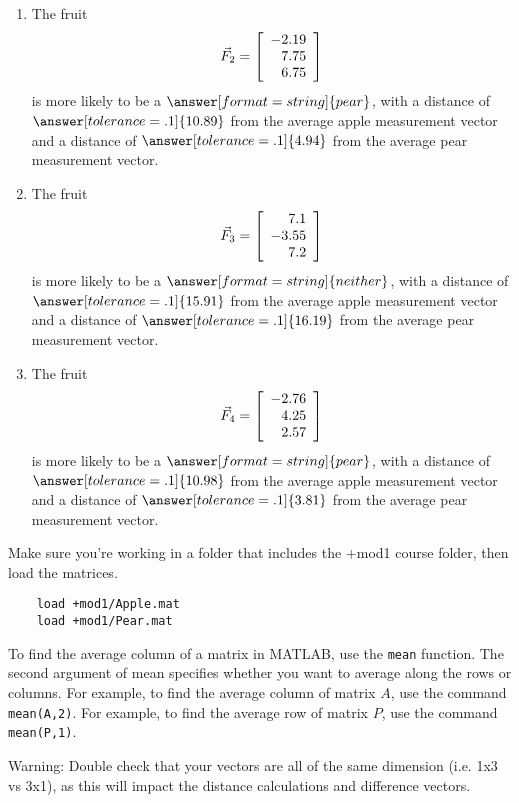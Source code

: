 \documentclass{ximera}
\begin{document}
\begin{exercise}
\begin{enumerate}
\item
The fruit
\begin{equation*}
  \vec{F}_2=\startmat{r}
    -2.19 \\
    7.75 \\
    6.75
  \stopmat
\end{equation*}
is more likely to be a $\answer[format=string]{pear}$, with a distance of $\answer[tolerance=.1]{10.89}$ from the average apple measurement vector and a distance of $\answer[tolerance=.1]{4.94}$ from the average pear measurement vector.

\item
The fruit
\begin{equation*}
  \vec{F}_3=\startmat{r}
    7.1 \\
    -3.55 \\
    7.2
  \stopmat
\end{equation*}
is more likely to be a $\answer[format=string]{neither}$, with a distance of $\answer[tolerance=.1]{15.91}$ from the average apple measurement vector and a distance of $\answer[tolerance=.1]{16.19}$ from the average pear measurement vector.

\item
The fruit
\begin{equation*}
  \vec{F}_4=\startmat{r}
    -2.76 \\
    4.25 \\
    2.57
  \stopmat
\end{equation*}
is more likely to be a $\answer[format=string]{pear}$, with a distance of $\answer[tolerance=.1]{10.98}$ from the average apple measurement vector and a distance of $\answer[tolerance=.1]{3.81}$ from the average pear measurement vector.

\end{enumerate}

\begin{hint}

  Make sure you're working in a folder that includes the +mod1 course folder, then load the matrices.
  \begin{verbatim}
    load +mod1/Apple.mat
    load +mod1/Pear.mat
  \end{verbatim}

  To find the average column of a matrix in MATLAB, use the \texttt{mean} function. The second argument of mean specifies whether you want to average along the rows or columns. For example, to find the average column of matrix $A$, use the command \texttt{mean(A,2)}. For example, to find the average row of matrix $P$, use the command \texttt{mean(P,1)}.

  Warning: Double check that your vectors are all of the same dimension (i.e. 1x3 vs 3x1), as this will impact the distance calculations and difference vectors.

\end{hint}

  
\end{exercise}
\end{document}
